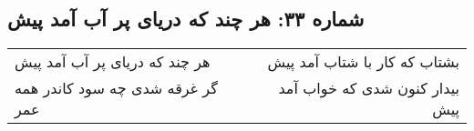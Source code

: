 \begin{center}
\section*{شماره ۳۳: هر چند که دریای پر آب آمد پیش}
\label{sec:033}
\begin{longtable}{l p{0.5cm} r}
هر چند که دریای پر آب آمد پیش
&&
بشتاب که کار با شتاب آمد پیش
\\
گر غرقه شدی چه سود کاندر همه عمر
&&
بیدار کنون شدی که خواب آمد پیش
\\
\end{longtable}
\end{center}
